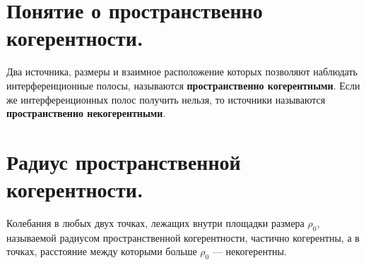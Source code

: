 \documentclass[a4paper, 12pt]{book}
\begin{document}
	\section{Понятие о пространственно когерентности.}
	Два источника, размеры и взаимное расположение которых позволяют наблюдать интерференционные полосы, называются \textbf{пространственно когерентными}. Если же интерференционных полос получить нельзя, то источники называются \textbf{пространственно некогерентными}.
	\section{Радиус пространственной когерентности.}
	Колебания в любых двух точках, лежащих внутри площадки размера $\rho_0$, называемой радиусом пространственной когерентности, частично когерентны, а в точках, расстояние между которыми больше $\rho_0$ — некогерентны.
\end{document}
